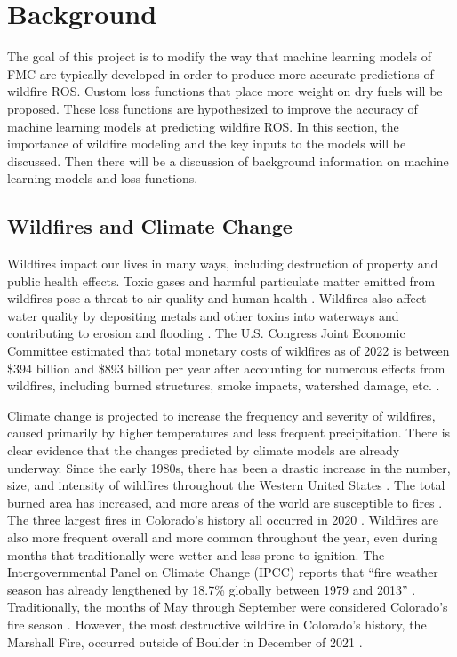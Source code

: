 \documentclass[11pt]{article}%
\begin{document}
\newpage
\tableofcontents
\newpage

\section{Background}

The goal of this project is to modify the way that machine learning models of FMC are typically developed in order to produce more accurate predictions of wildfire ROS. Custom loss functions that place more weight on dry fuels will be proposed. These loss functions are hypothesized to improve the accuracy of machine learning models at predicting wildfire ROS. In this section, the importance of wildfire modeling and the key inputs to the models will be discussed. Then there will be a discussion of background information on machine learning models and loss functions.

\subsection{Wildfires and Climate Change}

Wildfires impact our lives in many ways, including destruction of property and public health effects. Toxic gases and harmful particulate matter emitted from wildfires pose a threat to air quality and human health \citep[e.g.,][]{WHO-2024-WFS}. Wildfires also affect water quality by depositing metals and other toxins into waterways and contributing to erosion and flooding \citep{USGS-2024-WQA}. The U.S. Congress Joint Economic Committee estimated that total monetary costs of wildfires as of 2022 is between \$394 billion and \$893 billion per year after accounting for numerous effects from wildfires, including burned structures, smoke impacts, watershed damage, etc. \citep{JEC-2023-CEW}.

Climate change is projected to increase the frequency and severity of wildfires, caused primarily by higher temperatures and less frequent precipitation. There is clear evidence that the changes predicted by climate models are already underway. Since the early 1980s, there has been a drastic increase in the number, size, and intensity of wildfires throughout the Western United States \citep{Cartier-2022-UFQ}. The total burned area has increased, and more areas of the world are susceptible to fires \citep{IPCC-2021-LCI}. The three largest fires in Colorado’s history all occurred in 2020 \citep{CDFPC-2024-HWI}. Wildfires are also more frequent overall and more common throughout the year, even during months that traditionally were wetter and less prone to ignition. The Intergovernmental Panel on Climate Change (IPCC) reports that “fire weather season has already lengthened by 18.7\% globally between 1979 and 2013” \citep{IPCC-2021-LCI}. Traditionally, the months of May through September were considered Colorado’s fire season \citep{WFCA-2023-CFS}. However, the most destructive wildfire in Colorado’s history, the Marshall Fire, occurred outside of Boulder in December of 2021 \citep{CDFPC-2024-HWI}.
\end{document}
